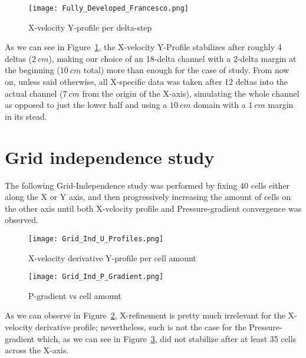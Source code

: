 \documentclass[12pt]{article}
\begin{document}
        \begin{figure}[!ht]
                \texttt{[image: Fully\_Developed\_Francesco.png]}
                \centering
                \caption{X-velocity Y-profile per delta-step}
                \label{fig:delta-steps}
        \end{figure}

        As we can see in Figure~\ref{fig:delta-steps}, the X-velocity Y-Profile stabilizes after roughly 4 deltas ($ 2 \: cm $), making our choice of an 18-delta channel with a 2-delta margin at the beginning ($ 10 \: cm $ total) more than enough for the case of study. From now on, unless said otherwise, all X-specific data was taken after 12 deltas into the actual channel ($ 7 \: cm $ from the origin of the X-axis), simulating the whole channel as opposed to just the lower half and using a \( 10 \: cm \) domain with a \( 1 \: cm \) margin in its stead.

\section{Grid independence study} \label{sec:independence}

        The following Grid-Independence study was performed by fixing 40 cells either along the X or Y axis, and then progressively increasing the amount of cells on the other axis until both X-velocity profile and Pressure-gradient convergence was observed.

        \begin{figure}[!ht]
                \texttt{[image: Grid\_Ind\_U\_Profiles.png]}
                \centering
                \caption{X-velocity derivative Y-profile per cell amount}
                \label{fig:grid_ind_u}
        \end{figure}

        \begin{figure}[!ht]
                \texttt{[image: Grid\_Ind\_P\_Gradient.png]}
                \centering
                \caption{P-gradient vs cell amount}
                \label{fig:grid_ind_p}
        \end{figure}

        As we can observe in Figure~\ref{fig:grid_ind_u}, X-refinement is pretty much irrelevant for the X-velocity derivative profile; nevertheless, such is not the case for the Pressure-gradient which, as we can see in Figure~\ref{fig:grid_ind_p}, did not stabilize after at least 35 cells across the X-axis.
\end{document}
